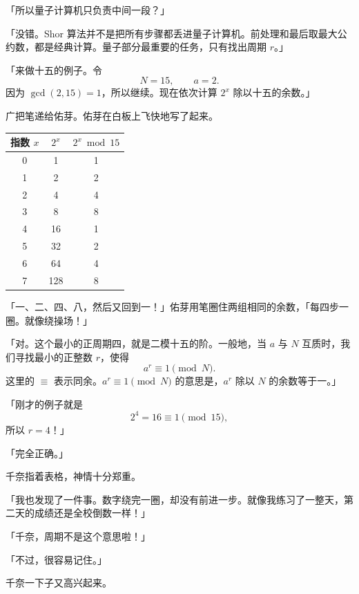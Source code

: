 「所以量子计算机只负责中间一段？」

「没错。Shor 算法并不是把所有步骤都丢进量子计算机。前处理和最后取最大公约数，都是经典计算。量子部分最重要的任务，只有找出周期 $r$。」

「来做十五的例子。令
\begin{equation}
N=15, \qquad a=2.
\end{equation}
因为 $\gcd(2,15)=1$，所以继续。现在依次计算 $2^x$ 除以十五的余数。」

广把笔递给佑芽。佑芽在白板上飞快地写了起来。

\begin{center}
\small
\begin{tabular}{ccc}
\toprule
指数 $x$ & $2^x$ & $2^x \bmod 15$ \\
\midrule
0 & 1   & 1 \\
1 & 2   & 2 \\
2 & 4   & 4 \\
3 & 8   & 8 \\
4 & 16  & 1 \\
5 & 32  & 2 \\
6 & 64  & 4 \\
7 & 128 & 8 \\
\bottomrule
\end{tabular}
\end{center}

「一、二、四、八，然后又回到一！」佑芽用笔圈住两组相同的余数，「每四步一圈。就像绕操场！」

「对。这个最小的正周期四，就是二模十五的阶。一般地，当 $a$ 与 $N$ 互质时，我们寻找最小的正整数 $r$，使得
\begin{equation}
a^r \equiv 1 \pmod N.
\end{equation}
这里的 $\equiv$ 表示同余。$a^r \equiv 1 \pmod N$ 的意思是，$a^r$ 除以 $N$ 的余数等于一。」

「刚才的例子就是
\begin{equation}
2^4=16\equiv 1 \pmod {15},
\end{equation}
所以 $r=4$！」

「完全正确。」

千奈指着表格，神情十分郑重。

「我也发现了一件事。数字绕完一圈，却没有前进一步。就像我练习了一整天，第二天的成绩还是全校倒数一样！」

「千奈，周期不是这个意思啦！」

「不过，很容易记住。」

千奈一下子又高兴起来。

